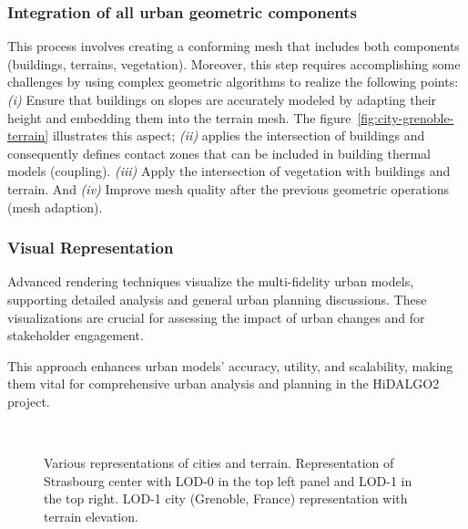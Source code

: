 \documentclass[runningheads]{llncs}
\newcommand{\imagedir}{./} %
\begin{document}
\subsubsection{Integration of all urban geometric components}
This process involves creating a conforming mesh that includes both components (buildings, terrains, vegetation). Moreover, this step requires accomplishing some challenges by using complex geometric algorithms to realize the following points: \textit{(i)} Ensure that buildings on slopes are accurately modeled by adapting their height and embedding them into the terrain mesh. The figure~\ref{fig:city-grenoble-terrain} illustrates this aspect; \textit{(ii)} applies the intersection of buildings and consequently defines contact zones that can be included in building thermal models (coupling). \textit{(iii)} Apply the intersection of vegetation with buildings and terrain. 
And \textit{(iv)} Improve mesh quality after the previous geometric operations (mesh adaption).

\subsubsection{Visual Representation}
Advanced rendering techniques visualize the multi-fidelity urban models, supporting detailed analysis and general urban planning discussions. These visualizations are crucial for assessing the impact of urban changes and for stakeholder engagement.

This approach enhances urban models' accuracy, utility, and scalability, making them vital for comprehensive urban analysis and planning in the HiDALGO2 project.

\begin{wrapfigure}{R}{0.6\textwidth}
\centering
{}
\hfill %
\\ %


\caption{Various representations of cities and terrain. Representation of Strasbourg center with LOD-0 in the top left panel and LOD-1 in the top right. LOD-1 city (Grenoble, France) representation with terrain elevation.}
\label{fig:city-strasbourg}
\end{wrapfigure}
\end{document}
